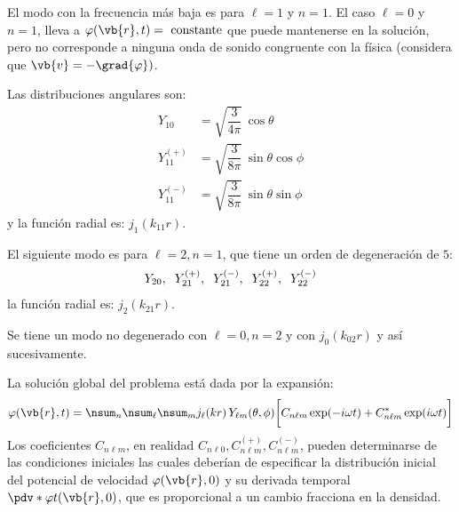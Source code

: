 El modo con la frecuencia más baja es para $\ell = 1$ y $n = 1$. El caso $\ell = 0$ y $n = 1$, lleva a $\varphi (\vb{r}, t) = \mbox{ constante}$ que puede mantenerse en la solución, pero no corresponde a ninguna onda de sonido congruente con la física (considera que $\vb{v} = - \grad{\varphi})$.
\par
Las distribuciones angulares son:
\begin{align*}
Y_{10} &= \sqrt{\dfrac{3}{4 \pi}} \, \cos \theta \\[0.5em]
Y_{11}^{(+)} &= \sqrt{\dfrac{3}{8 \pi}} \, \sin \theta \cos \phi \\[0.5em]
Y_{11}^{(-)} &= \sqrt{\dfrac{3}{8 \pi}} \, \sin \theta \sin \phi
\end{align*}
y la función radial es: $j_{1} (k_{11} r)$.
\par
El siguiente modo es para $\ell = 2, n= 1$, que tiene un orden de degeneración de $5$:
\begin{align*}
Y_{20}, \hspace{0.2cm} Y_{21}^{(+)}, \hspace{0.2cm} Y_{21}^{(-)}, \hspace{0.2cm} Y_{22}^{(+)}, \hspace{0.2cm} Y_{22}^{(-)}
\end{align*}
la función radial es: $j_{2} (k_{21} r)$.
\par
Se tiene un modo no degenerado con $\ell = 0, n = 2$ y con $j_{0} (k_{02} r)$ y así sucesivamente.
\par
La solución global del problema está dada por la expansión:
\begin{align*}
\varphi (\vb{r}, t) = \nsum_{n} \nsum_{\ell} \nsum_{m} j_{\ell} (k r) \, Y_{\ell m} (\theta, \phi) \bigg[ C_{n \ell m} \exp(-i \omega t) + C_{n \ell m}^{*} \exp(i \omega t) \bigg]
\end{align*}
Los coeficientes $C_{n \ell m}$, en realidad $C_{n \ell 0}, C_{n \ell m}^{(+)}, C_{n \ell m}^{(-)}$, pueden determinarse de las condiciones iniciales las cuales deberían de especificar la distribución inicial del potencial de velocidad $\varphi (\vb{r}, 0)$ y su derivada temporal $\pdv*{\varphi}{t} (\vb{r}, 0)$, que es proporcional a un cambio fracciona en la densidad.
